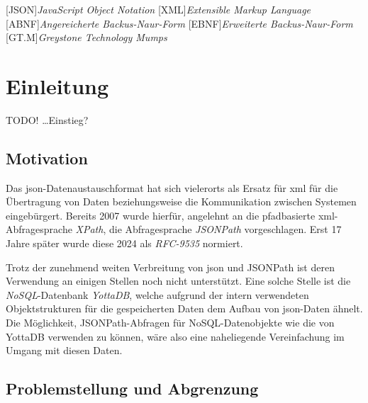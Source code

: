 \documentclass[oneside]{ausarbeitung}
\begin{document}
	\begin{acronym}
    		{\textit{JavaScript Object Notation}}
		[XML]{\textit{Extensible Markup Language}}
		{\textit{Angereicherte Backus-Naur-Form}}
		{\textit{Erweiterte Backus-Naur-Form}}
		{\textit{Greystone Technology Mumps}}
	\end{acronym}
	
	
	\cleardoublepage
	\setcounter{page}{1}
	




	\chapter{Einleitung}
	\label{chapt_einleitung}
	
	
	
	TODO!
	…Einstieg?
	
	\section{Motivation}
	
	Das \ac{json}-Datenaustauschformat hat sich vielerorts als Ersatz für \ac{xml} für die Übertragung von Daten beziehungsweise die Kommunikation zwischen Systemen eingebürgert. Bereits 2007 wurde hierfür, angelehnt an die pfadbasierte \ac{xml}-Abfragesprache \textit{XPath}, die Abfragesprache \textit{JSONPath} vorgeschlagen. Erst 17 Jahre später wurde diese 2024 als \textit{RFC-9535} normiert. 
	
	
	Trotz der zunehmend weiten Verbreitung von \ac{json} und JSONPath ist deren Verwendung an einigen Stellen noch nicht unterstützt. Eine solche Stelle ist die \textit{NoSQL}-Datenbank \textit{YottaDB}, welche aufgrund der intern verwendeten Objektstrukturen für die gespeicherten Daten dem Aufbau von \ac{json}-Daten ähnelt. Die Möglichkeit, JSONPath-Abfragen für NoSQL-Datenobjekte wie die von YottaDB verwenden zu können, wäre also eine naheliegende Vereinfachung im Umgang mit diesen Daten.
	
	
	
	\section{Problemstellung und Abgrenzung}
	
\end{document}

